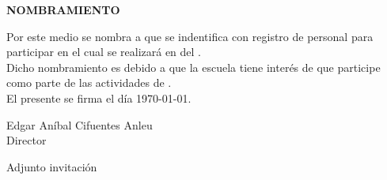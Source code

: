 \documentclass[12pt,twoside]{book}
\begin{document}
\thispagestyle{empty}
\vspace{2cm}
\begin{center}
	\Huge \textbf{NOMBRAMIENTO}
\end{center}
\vspace{2cm} 
Por este medio se nombra a \nombre  que se indentifica con registro de personal \registro para participar en \evento el cual se realizará en \lugar del  \dias.\\

\noindent Dicho  nombramiento es debido a que la escuela tiene interés de que participe como parte de las actividades de \tipoEvento. \\

\noindent El presente se firma el día \today. \\
\vspace{2cm}

\begin{center}
	Edgar Aníbal Cifuentes Anleu\\
	Director
\end{center}

\vspace{2cm}
\noindent Adjunto invitación
\end{document}
